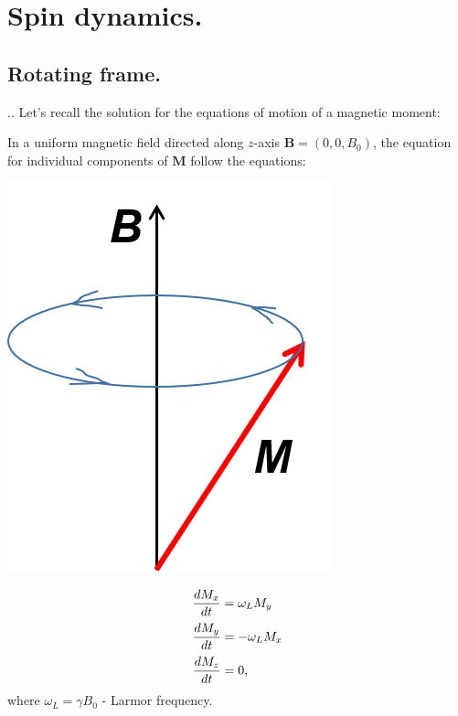 \documentclass{beamer}
\begin{document}
\section{Spin dynamics.}
\subsection{Rotating frame.}

\begin{frame}[shrink=5]{\thesection.\thesubsection. \insertsubsection}
	Let's recall the solution for the equations of motion of a magnetic moment:
	
		    In a uniform magnetic field directed along $z$-axis $\bm{B} = (0, 0, B_0)$, the equation for individual components of $\bm{M}$ follow the equations:
		    
		    \begin{minipage}[b][4cm]{0.4\textwidth}
		    	\centering
		    	\includegraphics[width=0.7\textwidth]{precession.png}
		    \end{minipage}
		    \hspace{0.1cm}		    
		    \begin{minipage}[b][4cm]{0.4\textwidth}
		    	\centering
		    	\begin{equation} \label{precession}
		    	\setlength{\jot}{5pt}
		    	\begin{aligned}
		    	\dfrac{dM_x}{dt} & =  \omega_L M_y \\
		    	\dfrac{dM_y}{dt} & =  -\omega_L M_x \\
		    	\dfrac{dM_z}{dt} & =  0,
		    	\end{aligned}
		    	\end{equation}
		    	where $\omega_L = \gamma B_0$ - \alert{Larmor frequency}.
		    \end{minipage}
		    

\end{frame}
\end{document}
